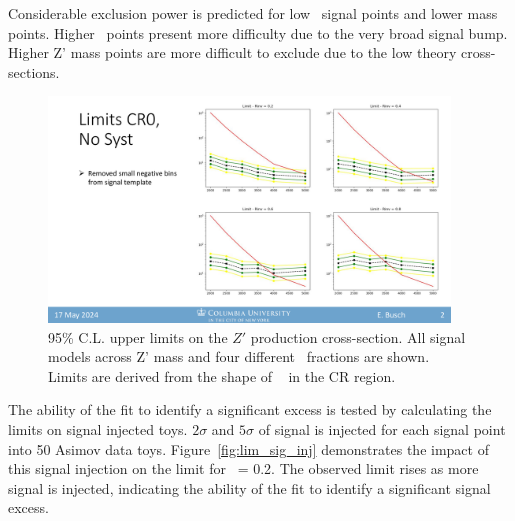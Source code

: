 Considerable exclusion power is predicted for low \rinv~signal points and lower mass points.
Higher \rinv~points present more difficulty due to the very broad signal bump.
Higher Z' mass points are more difficult to exclude due to the low theory cross-sections.
\begin{figure}[!htbp]
\centering
   \includegraphics[width=0.95\textwidth]{figures/stats/limits_exp_1D}
    \caption{95\% C.L. upper limits on the $Z'$ production cross-section. All signal models across Z' mass and four different \rinv~fractions are shown. Limits are derived from the shape of \mt~ in the CR region. 
    \label{fig:limits_exp_1D}}
\end{figure}


The ability of the fit to identify a significant excess is tested by calculating the limits on signal injected toys. $2\sigma$ and $5\sigma$ of signal is injected for each signal point into 50 Asimov data toys.
Figure~\ref{fig:lim_sig_inj} demonstrates the impact of this signal injection on the limit for \rinv~= 0.2.
The observed limit rises as more signal is injected, indicating the ability of the fit to identify a significant signal excess. 


